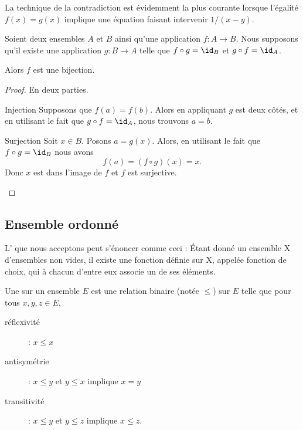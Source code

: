 La technique de la contradiction est évidemment la plus courante lorsque l'égalité \( f(x)=g(x)\) implique une équation faisant intervenir \( 1/(x-y)\).

\begin{lemma}       \label{LEMooWBYSooFqyqQP}
    Soient deux ensembles \( A\) et \( B\) ainsi qu'une application \( f\colon A\to B\). Nous supposons qu'il existe une application \( g\colon B\to A\) telle que \( f\circ g=\id_B\) et \( g\circ f=\id_A\).

    Alors \( f\) est une bijection.
\end{lemma}

\begin{proof}
    En deux parties.
    \begin{subproof}
    \item[Injection]
        Supposons que \( f(a)=f(b)\). Alors en appliquant \( g\) est deux côtés, et en utilisant le fait que \( g\circ f=\id_A\), nous trouvons \( a=b\).
    \item[Surjection]
        Soit \( x\in B\). Posons \( a=g(x)\). Alors, en utilisant le fait que \( f\circ g=\id_B\) nous avons
        \begin{equation}
            f(a)=(f\circ g)(x)=x.
        \end{equation}
        Donc \( x\) est dans l'image de \( f\) et \( f\) est surjective.
    \end{subproof}
\end{proof}

\subsection{Ensemble ordonné}

\begin{normaltext}\label{NORooLMBYooYjUoju}
L' que nous acceptons peut s'énoncer comme ceci\cite{ooKLIXooHbpufL} : Étant donné un ensemble X d'ensembles non vides, il existe une fonction définie sur X, appelée fonction de choix, qui à chacun d'entre eux associe un de ses éléments.
\end{normaltext}

\begin{definition}      \label{DefooFLYOooRaGYRk}
    Une  sur un ensemble \( E\) est une relation binaire (notée \( \leq\)) sur \( E\) telle que pour tous \( x,y,z\in E\),
    \begin{description}
        \item[réflexivité] : \( x\leq x\)
         \item[antisymétrie] : \( x\leq y\) et \( y\leq x\) implique \( x=y\)
         \item[transitivité] : \( x\leq y\) et \( y\leq z\) implique \( x\leq z\).
    \end{description}
\end{definition}

